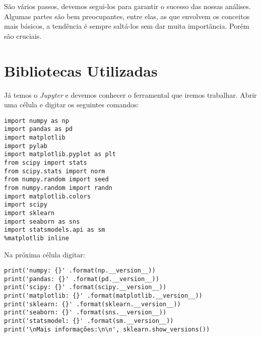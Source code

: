 São vários passos, devemos segui-los para garantir o sucesso das nossas análises. Algumas partes são bem preocupantes, entre elas, as que envolvem os conceitos mais básicos, a tendência é sempre saltá-los sem dar muita importância. Porém são cruciais.

\section{Bibliotecas Utilizadas}
Já temos o \textit{Jupyter} e devemos conhecer o ferramental que iremos trabalhar. Abrir uma célula e digitar os seguintes comandos:
\begin{lstlisting}[]
import numpy as np
import pandas as pd
import matplotlib
import pylab
import matplotlib.pyplot as plt
from scipy import stats
from scipy.stats import norm
from numpy.random import seed
from numpy.random import randn
import matplotlib.colors
import scipy
import sklearn
import seaborn as sns
import statsmodels.api as sm
%matplotlib inline
\end{lstlisting}

Na próxima célula digitar:
\begin{lstlisting}[]
print('numpy: {}' .format(np.__version__))
print('pandas: {}' .format(pd.__version__))
print('scipy: {}' .format(scipy.__version__))
print('matplotlib: {}' .format(matplotlib.__version__))
print('sklearn: {}' .format(sklearn.__version__))
print('seaborn: {}' .format(sns.__version__))
print('statsmodel: {}' .format(sm.__version__))
print('\nMais informações:\n\n', sklearn.show_versions())
\end{lstlisting}

